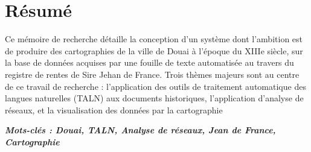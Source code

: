 \chapter*{Résumé}
 Ce mémoire de recherche détaille la conception d’un système dont l’ambition est de produire des cartographies de la ville de Douai à l’époque du XIIIe siècle, sur la base de données acquises par une fouille de texte automatisée au travers du registre de rentes de Sire Jehan de France.
 Trois thèmes majeurs sont au centre de ce travail de recherche : l’application des outils de traitement automatique des langues naturelles (TALN) aux documents historiques, l'application d'analyse de réseaux, et la visualisation des données par la cartographie 
 
\vspace{0.5cm}
\textbf{\textit{Mots-clés : Douai, TALN, Analyse de réseaux, Jean de France, Cartographie}}


